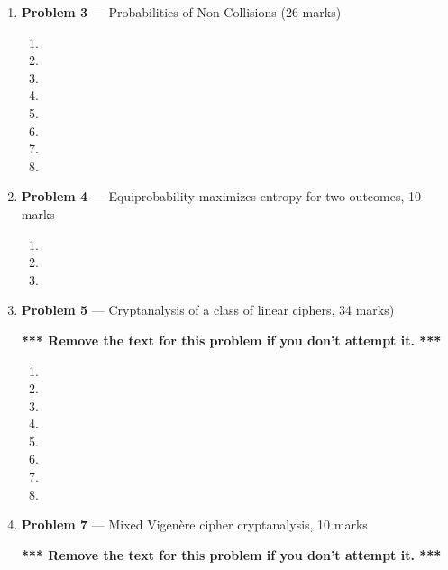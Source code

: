 \documentclass[11pt]{article}
\theoremstyle{definition}
\begin{document}
\begin{enumerate}
\begin{enumerate}
\end{enumerate}

\newpage

\item[] \textbf{Problem 3} --- Probabilities of Non-Collisions (26 marks)

\begin{enumerate}
\item
\item
\item
\item
\item
\item
\item
\item
\end{enumerate}

\newpage

\item[] \textbf{Problem 4} --- Equiprobability maximizes entropy for two outcomes, 10 marks
\begin{enumerate}
\item

\item
\item
\end{enumerate}

\newpage

\item[] \textbf{Problem 5} --- Cryptanalysis of a class of linear ciphers, 34 marks)

\textbf{*** Remove the text for this problem if you don't attempt it. ***}

\begin{enumerate}
\item
\item
\item
\item
\item
\item
\item
\item
\end{enumerate}

\newpage

\item[] \textbf{Problem 7} --- Mixed Vigen\`ere cipher cryptanalysis, 10 marks

\textbf{*** Remove the text for this problem if you don't attempt it. ***}


\end{enumerate}
\end{document}
